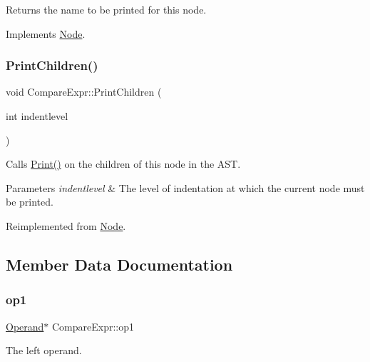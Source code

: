 Returns the name to be printed for this node. 

Implements \hyperlink{class_node_a56e29657306ffb004d69c6929ae44269}{Node}.

\mbox{\label{class_compare_expr_a0a29abbf82133a8a39f5540e68b9b798}} 
\subsubsection{\texorpdfstring{Print\+Children()}{PrintChildren()}}
{\footnotesize\ttfamily void Compare\+Expr\+::\+Print\+Children (\begin{DoxyParamCaption}\item[{int}]{indentlevel }\end{DoxyParamCaption})\hspace{0.3cm}{\ttfamily [virtual]}}

Calls \hyperlink{class_node_a9ef727fd72d1a37792b3db60a8a479dd}{Print()} on the children of this node in the A\+ST. 
\begin{DoxyParams}{Parameters}
{\em indentlevel} & The level of indentation at which the current node must be printed. \\
\hline
\end{DoxyParams}


Reimplemented from \hyperlink{class_node_a3e67ec8d22182b721717af14fe0c3000}{Node}.



\subsection{Member Data Documentation}
\mbox{\label{class_compare_expr_a5c8876f3b3d13cceaeef338e2db519f7}} 
\subsubsection{\texorpdfstring{op1}{op1}}
{\footnotesize\ttfamily \hyperlink{class_operand}{Operand}$\ast$ Compare\+Expr\+::op1\hspace{0.3cm}{\ttfamily [protected]}}

The left operand. \mbox{\label{class_compare_expr_a3f32ffb22ac225f4581b284a9f97f2e7}} 
